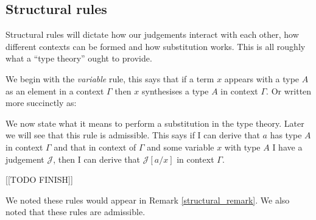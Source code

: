\subsection{Structural rules}

Structural rules will dictate how our judgements interact with each other, how different contexts can be formed and how substitution works. This is all roughly what a ``type theory'' ought to provide.

\begin{defin}
    We begin with the \emph{variable} rule, this says that if a term $x$ appears with a type $A$ as an element in a context $\Gamma$ then $x$ synthesises a type $A$ in context $\Gamma$. Or written more succinctly as:

    \begin{prooftree}
    \end{prooftree}

    We now state what it means to perform a substitution in the type theory. Later we will see that this rule is admissible. This says if I can derive that $a$ has type $A$ in context $\Gamma$ and that in context of $\Gamma$ and some variable $x$ with type $A$ I have a judgement $\mathcal{J}$, then I can derive that $\mathcal{J}[a/x]$ in context $\Gamma$.

    \begin{prooftree}
    \end{prooftree}

    \begin{prooftree}
    \end{prooftree}
    
        [[TODO FINISH]]

\end{defin}

\begin{remark}
    We noted these rules would appear in Remark \ref{structural_remark}. We also noted that these rules are admissible.
\end{remark}

